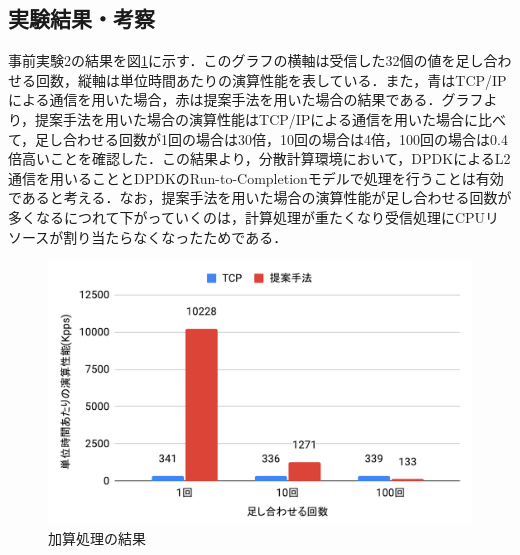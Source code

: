 \subsection{実験結果・考察}
事前実験2の結果を図\ref{fig:PreEvaluationTwoResult}に示す．このグラフの横軸は受信した32個の値を足し合わせる回数，縦軸は単位時間あたりの演算性能を表している．また，青はTCP/IPによる通信を用いた場合，赤は提案手法を用いた場合の結果である．グラフより，提案手法を用いた場合の演算性能はTCP/IPによる通信を用いた場合に比べて，足し合わせる回数が1回の場合は30倍，10回の場合は4倍，100回の場合は0.4倍高いことを確認した．この結果より，分散計算環境において，DPDKによるL2通信を用いることとDPDKのRun-to-Completionモデルで処理を行うことは有効であると考える．なお，提案手法を用いた場合の演算性能が足し合わせる回数が多くなるにつれて下がっていくのは，計算処理が重たくなり受信処理にCPUリソースが割り当たらなくなったためである．

\begin{figure}[htb]
  \centering
  \includegraphics[width=\columnwidth]{pictures/PreExperimentTwoResult.pdf}
  \caption{加算処理の結果}
  \label{fig:PreEvaluationTwoResult}
\end{figure}
